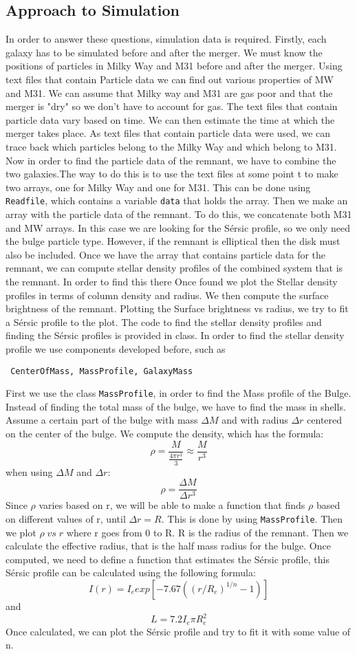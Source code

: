 \documentclass[linenumbers, preprint, times]{aastex631}
\begin{document}
\subsection{Approach to Simulation}
In order to answer these questions, simulation data is required. Firstly, each galaxy has to be simulated before and after the merger. We must know the positions of particles in Milky Way and M31 before and after the merger. Using text files that contain Particle data we can find out various properties of MW and M31. We can assume that Milky way and M31 are gas poor and that the merger is "dry" so we don't have to account for gas. The text files that contain particle data vary based on time. We can then estimate the time at which the merger takes place. As text files that contain particle data were used, we can trace back which particles belong to the Milky Way and which belong to M31. Now in order to find the particle data of the remnant, we have to combine the two galaxies.The way to do this is to use the text files at some point t to make two arrays, one for Milky Way and one for M31. This can be done using \verb+Readfile+, which contains a variable \verb+data+ that holds the array.
Then we make an array with the particle data of the remnant. To do this, we concatenate both M31 and MW arrays. In this case we are looking for the Sérsic profile, so we only need the bulge particle type. However, if the remnant is elliptical then the disk must also be included. Once we have the array that contains particle data for the remnant, we can compute stellar density profiles of the combined system that is the remnant. In order to find this there
Once found we plot the Stellar density profiles in terms of column density and radius. We then compute the surface brightness of the remnant. Plotting the Surface brightness vs radius, we try to fit a Sérsic profile to the plot. The code to find the stellar density profiles and finding the Sérsic profiles is provided in class. In order to find the stellar density profile we use components developed before, such as \begin{verbatim} CenterOfMass, MassProfile, GalaxyMass \end{verbatim} First we use the class \verb+MassProfile+, in order to find the Mass profile of the Bulge. Instead of finding the total mass of the bulge, we have to find the mass in shells. Assume a certain part of the bulge with mass $\Delta M$ and with radius $\Delta r$ centered on the center of the bulge. We compute the density, which has the formula: \[\rho =  \frac{M}{\frac{4\pi r^3}{3}} \approx\frac{M}{r^3}\] when using $\Delta M$ and $\Delta r$:
\[\rho = \frac{\Delta M}{\Delta r^3}\] Since $\rho$ varies based on r, we will be able to make a function that finds $\rho$ based on different values of r, until $\Delta r = R$. This is done by using \verb+MassProfile+.
Then we plot $\rho\;vs\;r$ where r goes from 0 to R. R is the radius of the remnant. Then we calculate the effective radius, that is the half mass radius for the bulge. Once computed, we need to define a function that estimates the Sérsic profile, this Sérsic profile can be calculated using the following formula: \[
I(r) = I_e exp{[-7.67 ( (r/R_e)^{1/n} - 1)]}
\] and \[L = 7.2 I_e \pi R_e^2\] Once calculated, we can plot the Sérsic profile and try to fit it with some value of n.
\end{document}
